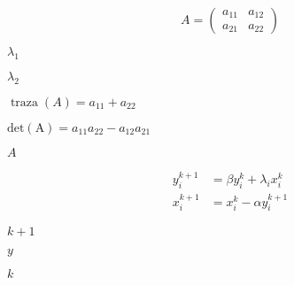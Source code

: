 \documentclass[10pt]{book}
\begin{document}
\begin{mdSnippets}
\begin{mdDisplaySnippet}[a57d9a986591160954a5faa7739ff1ae]%
\[%
A=\begin{pmatrix}
a_{11}&a_{12}\\
a_{21}&a_{22}
\end{pmatrix} 
\]%
\end{mdDisplaySnippet}%
\begin{mdInlineSnippet}[ef8865f6e97b1f942ba13021e6302cb4]%
$\lambda_1$\end{mdInlineSnippet}%
\begin{mdInlineSnippet}[fa114695aec226f8062b6702f7c89dd8]%
$\lambda_2$\end{mdInlineSnippet}%
\begin{mdInlineSnippet}%
$\operatorname{traza}(A)=a_{11} + a_{22}$\end{mdInlineSnippet}%
\begin{mdInlineSnippet}[decfc2858537f3b6347f4f7949d168f3]%
$\operatorname{det(A)}=a_{11}a_{22}-a_{12}a_{21}$\end{mdInlineSnippet}%
\begin{mdInlineSnippet}[7fc56270e7a70fa81a5935b72eacbe29]%
$A$\end{mdInlineSnippet}%
\begin{mdDisplaySnippet}[196ae4117aab1385b7a96e475638860d]%
\[%
\begin{aligned}
y_{i}^{k+1} &=\beta y_{i}^{k}+\lambda_{i} x_{i}^{k} \\
x_{i}^{k+1} &=x_{i}^{k}-\alpha y_{i}^{k+1}
\end{aligned}   
\]%
\end{mdDisplaySnippet}%
\begin{mdInlineSnippet}[a31a860e7a59c7616c1515ec3ae652a6]%
$k+1$\end{mdInlineSnippet}%
\begin{mdInlineSnippet}[415290769594460e2e485922904f345d]%
$y$\end{mdInlineSnippet}%
\begin{mdInlineSnippet}[8ce4b16b22b58894aa86c421e8759df3]%
$k$\end{mdInlineSnippet}%

\end{mdSnippets}
\end{document}
